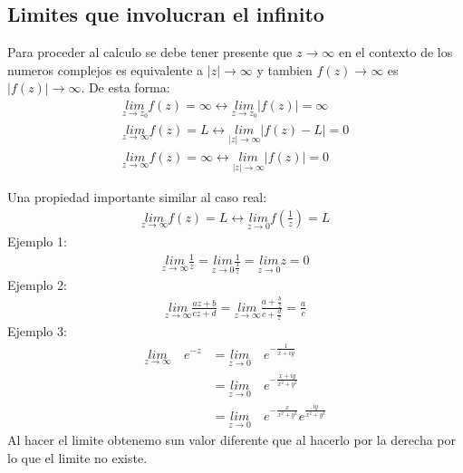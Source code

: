 \documentclass{article}
\begin{document}
\subsection{Limites que involucran el infinito}
Para proceder al calculo se debe tener presente que $ z \rightarrow \infty $ en el contexto de los numeros complejos es equivalente a $ \left|z \right| \rightarrow  \infty $ y tambien $ f(z) \rightarrow \infty $ es $ \left|f(z) \right| \rightarrow \infty $. De esta forma: 
\begin{gather*}
  \underset{z  \rightarrow z_0 }{lim}f(z) = \infty \leftrightarrow \underset{z  \rightarrow z_0 }{lim}\left|f(z) \right| = \infty \\
  \underset{z  \rightarrow \infty}{lim}f(z) =L \leftrightarrow \underset{\left|z \right| \rightarrow \infty}{lim}\left|f(z)- L \right| = 0 \\
  \underset{z  \rightarrow \infty}{lim}f(z) = \infty \leftrightarrow \underset{\left|z \right| \rightarrow \infty}{lim}\left|f(z) \right| = 0 
\end{gather*}

Una propiedad importante similar al caso real: 
\begin{gather*}
  \underset{z  \rightarrow \infty}{lim}f(z) = L \leftrightarrow \underset{z  \rightarrow  0 }{lim}f(\frac{1}{z }) = L 
\end{gather*}
Ejemplo 1: 
\begin{gather*}
  \underset{z  \rightarrow \infty}{lim}\frac{1}{z } = \underset{z  \rightarrow 0 }{lim}\frac{1}{\frac{1}{z }} = \underset{z  \rightarrow 0 }{lim}z = 0  
\end{gather*}
Ejemplo 2: 
\begin{gather*}
  \underset{z  \rightarrow \infty}{lim}\frac{az + b }{cz + d } = \underset{z  \rightarrow \infty}{lim}\frac{a + \frac{b }{z }}{c + \frac{d }{z }} = \frac{a }{c } 
\end{gather*}
Ejemplo 3: 
\begin{align*}
  \underset{z  \rightarrow \infty}{lim}\quad e ^ {-z } &= \underset{z  \rightarrow 0 }{lim}\quad e ^ {- \frac{1}{x + i y }}\\ 
  &= \underset{z  \rightarrow 0 }{lim}\quad e ^ {- \frac{x + i y }{x ^2+ y ^2}}\\
  & = \underset{z  \rightarrow 0 }{lim}\quad e ^ {- \frac{x }{x ^2 + y ^2}} e ^ { \frac{i y }{x ^2 + y ^2 }}
\end{align*}
Al hacer el limite obtenemo sun valor diferente que al hacerlo por la derecha por lo que el limite no existe.
\end{document}
